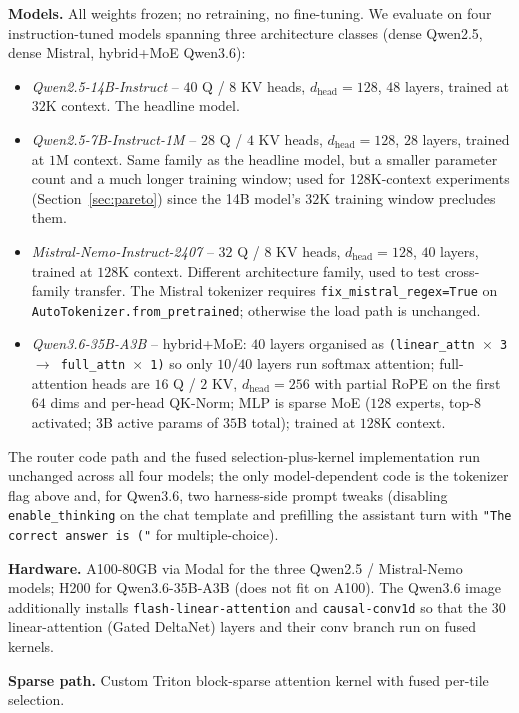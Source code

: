 \documentclass[11pt]{article}
\theoremstyle{remark}
\newcommand{\dhead}{d_{\text{head}}}
\begin{document}
\textbf{Models.} All weights frozen; no retraining, no fine-tuning. We evaluate on four instruction-tuned models spanning three architecture classes (dense Qwen2.5, dense Mistral, hybrid+MoE Qwen3.6):
\begin{itemize}[leftmargin=*,topsep=0.2em,itemsep=0.1em]
    \item \emph{Qwen2.5-14B-Instruct} -- $40$ Q / $8$ KV heads, $\dhead{=}128$, $48$ layers, trained at $32$K context. The headline model.
    \item \emph{Qwen2.5-7B-Instruct-1M} -- $28$ Q / $4$ KV heads, $\dhead{=}128$, $28$ layers, trained at $1$M context. Same family as the headline model, but a smaller parameter count and a much longer training window; used for 128K-context experiments (Section~\ref{sec:pareto}) since the 14B model's $32$K training window precludes them.
    \item \emph{Mistral-Nemo-Instruct-2407} -- $32$ Q / $8$ KV heads, $\dhead{=}128$, $40$ layers, trained at $128$K context. Different architecture family, used to test cross-family transfer. The Mistral tokenizer requires \texttt{fix\_mistral\_regex=True} on \texttt{AutoTokenizer.from\_pretrained}; otherwise the load path is unchanged.
    \item \emph{Qwen3.6-35B-A3B} -- hybrid+MoE: $40$ layers organised as \texttt{(linear\_attn $\times$ 3 $\to$ full\_attn $\times$ 1)} so only $10/40$ layers run softmax attention; full-attention heads are $16$ Q / $2$ KV, $\dhead{=}256$ with partial RoPE on the first $64$ dims and per-head QK-Norm; MLP is sparse MoE ($128$ experts, top-$8$ activated; $3$B active params of $35$B total); trained at $128$K context.
\end{itemize}
The router code path and the fused selection-plus-kernel implementation run unchanged across all four models; the only model-dependent code is the tokenizer flag above and, for Qwen3.6, two harness-side prompt tweaks (disabling \texttt{enable\_thinking} on the chat template and prefilling the assistant turn with \texttt{"The correct answer is ("} for multiple-choice).

\textbf{Hardware.} A100-80GB via Modal for the three Qwen2.5 / Mistral-Nemo models; H200 for Qwen3.6-35B-A3B (does not fit on A100). The Qwen3.6 image additionally installs \texttt{flash-linear-attention} and \texttt{causal-conv1d} so that the $30$ linear-attention (Gated DeltaNet) layers and their conv branch run on fused kernels.

\textbf{Sparse path.} Custom Triton block-sparse attention kernel with fused per-tile selection.
\end{document}
